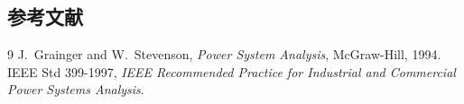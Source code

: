 \subsection{参考文献}
{\renewcommand{\section}[2]{}%
\begin{thebibliography}{9}\small
{} J.~Grainger and W.~Stevenson,
\emph{Power System Analysis}, McGraw-Hill, 1994.
 IEEE Std 399-1997, \emph{IEEE Recommended Practice for Industrial and Commercial Power Systems Analysis}.
\end{thebibliography}}
